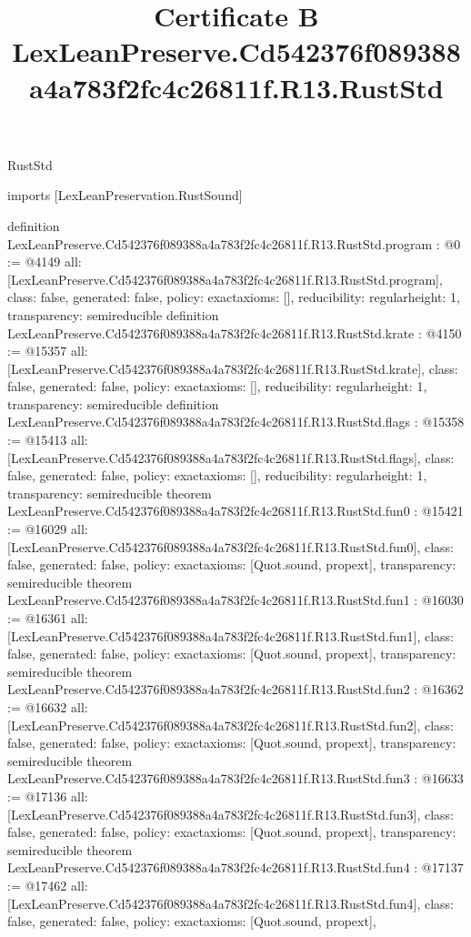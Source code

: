 \begin{lexlean}{RustStd}
\title{Certificate B LexLeanPreserve.Cd542376f089388a4a783f2fc4c26811f.R13.RustStd}
\begin{coremodule}
imports [LexLeanPreservation.RustSound]

definition LexLeanPreserve.Cd542376f089388a4a783f2fc4c26811f.R13.RustStd.program : @0 := @4149 {
  all: [LexLeanPreserve.Cd542376f089388a4a783f2fc4c26811f.R13.RustStd.program],
  class: false,
  generated: false,
  policy: exact{axioms: []},
  reducibility: regular{height: 1},
  transparency: semireducible
}
definition LexLeanPreserve.Cd542376f089388a4a783f2fc4c26811f.R13.RustStd.krate : @4150 := @15357 {
  all: [LexLeanPreserve.Cd542376f089388a4a783f2fc4c26811f.R13.RustStd.krate],
  class: false,
  generated: false,
  policy: exact{axioms: []},
  reducibility: regular{height: 1},
  transparency: semireducible
}
definition LexLeanPreserve.Cd542376f089388a4a783f2fc4c26811f.R13.RustStd.flags : @15358 := @15413 {
  all: [LexLeanPreserve.Cd542376f089388a4a783f2fc4c26811f.R13.RustStd.flags],
  class: false,
  generated: false,
  policy: exact{axioms: []},
  reducibility: regular{height: 1},
  transparency: semireducible
}
theorem LexLeanPreserve.Cd542376f089388a4a783f2fc4c26811f.R13.RustStd.fun0 : @15421 := @16029 {
  all: [LexLeanPreserve.Cd542376f089388a4a783f2fc4c26811f.R13.RustStd.fun0],
  class: false,
  generated: false,
  policy: exact{axioms: [Quot.sound, propext]},
  transparency: semireducible
}
theorem LexLeanPreserve.Cd542376f089388a4a783f2fc4c26811f.R13.RustStd.fun1 : @16030 := @16361 {
  all: [LexLeanPreserve.Cd542376f089388a4a783f2fc4c26811f.R13.RustStd.fun1],
  class: false,
  generated: false,
  policy: exact{axioms: [Quot.sound, propext]},
  transparency: semireducible
}
theorem LexLeanPreserve.Cd542376f089388a4a783f2fc4c26811f.R13.RustStd.fun2 : @16362 := @16632 {
  all: [LexLeanPreserve.Cd542376f089388a4a783f2fc4c26811f.R13.RustStd.fun2],
  class: false,
  generated: false,
  policy: exact{axioms: [Quot.sound, propext]},
  transparency: semireducible
}
theorem LexLeanPreserve.Cd542376f089388a4a783f2fc4c26811f.R13.RustStd.fun3 : @16633 := @17136 {
  all: [LexLeanPreserve.Cd542376f089388a4a783f2fc4c26811f.R13.RustStd.fun3],
  class: false,
  generated: false,
  policy: exact{axioms: [Quot.sound, propext]},
  transparency: semireducible
}
theorem LexLeanPreserve.Cd542376f089388a4a783f2fc4c26811f.R13.RustStd.fun4 : @17137 := @17462 {
  all: [LexLeanPreserve.Cd542376f089388a4a783f2fc4c26811f.R13.RustStd.fun4],
  class: false,
  generated: false,
  policy: exact{axioms: [Quot.sound, propext]},
}
\end{coremodule}
\end{lexlean}
